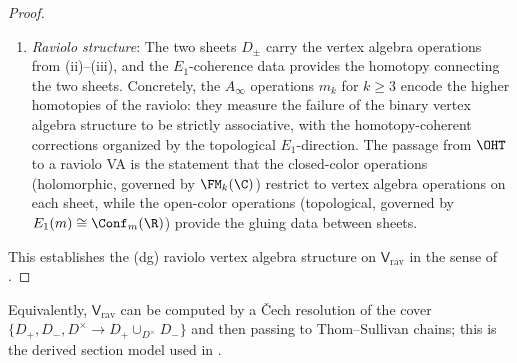\begin{proof}
\begin{enumerate}[label=(\roman*)]
\item \emph{Raviolo structure}: The two sheets $D_\pm$ carry the vertex algebra operations from (ii)--(iii), and the $E_1$-coherence data provides the homotopy connecting the two sheets. Concretely, the $A_\infty$ operations $m_k$ for $k\ge 3$ encode the higher homotopies of the raviolo: they measure the failure of the binary vertex algebra structure to be strictly associative, with the homotopy-coherent corrections organized by the topological $E_1$-direction. The passage from $\OHT$ to a raviolo VA is the statement that the closed-color operations (holomorphic, governed by $\FM_k(\C)$) restrict to vertex algebra operations on each sheet, while the open-color operations (topological, governed by $E_1(m)\cong\Conf_m(\R)$) provide the gluing data between sheets.
\end{enumerate}
This establishes the (dg) raviolo vertex algebra structure on $\mathsf{V}_{\mathrm{rav}}$ in the sense of \cite{GW23, AKY24}.
\end{proof}

\begin{remark}
\label{rmk:TS-model}
Equivalently, $\mathsf V_{\mathrm{rav}}$ can be computed by a Čech resolution of
the cover $\{D_+,D_-,D^\times\to D_+\cup_{D^\times}D_-\}$ and then passing to
Thom–Sullivan chains; this is the derived section model used in
\cite{GW23,AKY24}.
\end{remark}

